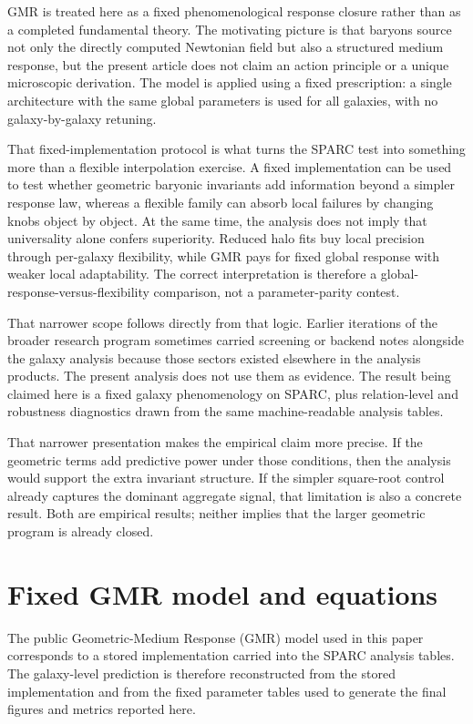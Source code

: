 ﻿\documentclass[twocolumn]{aastex701}
\begin{document}
GMR is treated here as a fixed phenomenological response closure rather than as a completed fundamental theory. The motivating picture is that baryons source not only the directly computed Newtonian field but also a structured medium response, but the present article does not claim an action principle or a unique microscopic derivation. The model is applied using a fixed prescription: a single architecture with the same global parameters is used for all galaxies, with no galaxy-by-galaxy retuning.

That fixed-implementation protocol is what turns the SPARC test into something more than a flexible interpolation exercise. A fixed implementation can be used to test whether geometric baryonic invariants add information beyond a simpler response law, whereas a flexible family can absorb local failures by changing knobs object by object. At the same time, the analysis does not imply that universality alone confers superiority. Reduced halo fits buy local precision through per-galaxy flexibility, while GMR pays for fixed global response with weaker local adaptability. The correct interpretation is therefore a global-response-versus-flexibility comparison, not a parameter-parity contest.

That narrower scope follows directly from that logic. Earlier iterations of the broader research program sometimes carried screening or backend notes alongside the galaxy analysis because those sectors existed elsewhere in the analysis products. The present analysis does not use them as evidence. The result being claimed here is a fixed galaxy phenomenology on SPARC, plus relation-level and robustness diagnostics drawn from the same machine-readable analysis tables.

That narrower presentation makes the empirical claim more precise. If the geometric terms add predictive power under those conditions, then the analysis would support the extra invariant structure. If the simpler square-root control already captures the dominant aggregate signal, that limitation is also a concrete result. Both are empirical results; neither implies that the larger geometric program is already closed.
\section{Fixed GMR model and equations}

The public Geometric-Medium Response (GMR) model used in this paper corresponds to a stored implementation carried into the SPARC analysis tables. The galaxy-level prediction is therefore reconstructed from the stored implementation and from the fixed parameter tables used to generate the final figures and metrics reported here.
\end{document}
